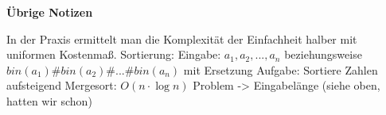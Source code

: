 \documentclass{article} %
\begin{document}



\begin{framed}
\textbf{Übrige Notizen}

In der Praxis ermittelt man die Komplexität der Einfachheit halber mit uniformen Kostenmaß.
Sortierung:
Eingabe: $a_1, a_2,...,a_n$ beziehungsweise $bin(a_1) \# bin(a_2) \# ... \# bin(a_n) $ mit Ersetzung 
Aufgabe: Sortiere Zahlen aufsteigend
Mergesort: $O(n \cdot \log n)$
Problem -> Eingabelänge (siehe oben, hatten wir schon)
\end{framed}
\end{document}
